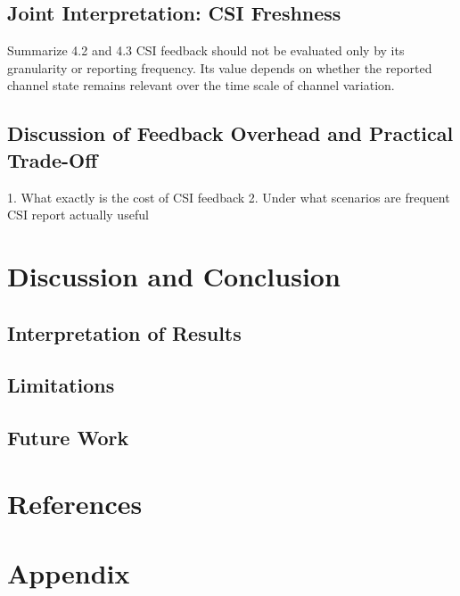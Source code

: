 \documentclass[a4paper,12pt,onecolumn]{article}
\begin{document}
		\newpage
	\subsection{Joint Interpretation: CSI Freshness}
	Summarize 4.2 and 4.3 
	CSI feedback should not be evaluated only by its granularity or reporting frequency. Its value depends on whether the reported channel state remains relevant over the time scale of channel variation.
	\subsection{Discussion of Feedback Overhead and Practical Trade-Off}
	1. What exactly is the cost of CSI  feedback
	2. Under what scenarios are frequent CSI report actually useful
	
	\newpage
	




\section{Discussion and Conclusion}
	\subsection{Interpretation of Results}
	
	\subsection{Limitations}
	
	\subsection{Future Work}
	
\newpage
\section{References} \let\refname\relax
\thispagestyle{empty}
	\vspace*{-1cm}
	\begingroup
	
\endgroup

\newpage
\section{Appendix}
\thispagestyle{empty}
\end{document}
